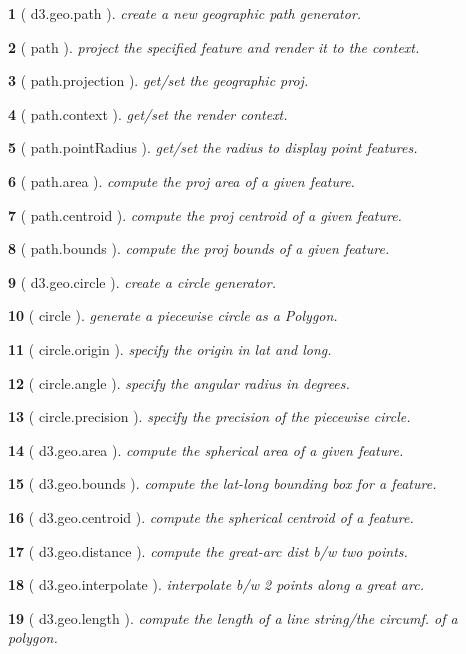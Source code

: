 \documentclass[10pt,landscape,letterpaper]{article}
\newcounter{thm}
\newcommand{\hdrule}{\vspace{-4pt} \hdashrule[0.25ex]{\fill}{.5pt}{1pt}\vspace{-4pt}}
\theoremstyle{mytheoremstyle}
\newtheorem*{thm}{}
\begin{document}
\begin{multicols}{3}
\begin{thm} [ d3.geo.path ]  create a new geographic path generator.
\end{thm}\begin{thm} [ path ]  project the specified feature and render it to the context.
\end{thm}\begin{thm} [ path.projection ]  get/set the geographic proj.
\end{thm}\begin{thm} [ path.context ]  get/set the render context.
\end{thm}\begin{thm} [ path.pointRadius ]  get/set the radius to display point features.
\end{thm}\begin{thm} [ path.area ]  compute the proj area of a given feature.
\end{thm}\begin{thm} [ path.centroid ]  compute the proj centroid of a given feature.
\end{thm}\begin{thm} [ path.bounds ]  compute the proj bounds of a given feature.
\end{thm}\begin{thm} [ d3.geo.circle ]  create a circle generator.
\end{thm}\begin{thm} [ circle ]  generate a piecewise circle as a Polygon.
\end{thm}\begin{thm} [ circle.origin ]  specify the origin in lat and long.
\end{thm}\begin{thm} [ circle.angle ]  specify the angular radius in degrees.
\end{thm}\begin{thm} [ circle.precision ]  specify the precision of the piecewise circle.
\end{thm}\begin{thm} [ d3.geo.area ]  compute the spherical area of a given feature.
\end{thm}\begin{thm} [ d3.geo.bounds ]  compute the lat-long bounding box for a feature.
\end{thm}\begin{thm} [ d3.geo.centroid ]  compute the spherical centroid of a feature.
\end{thm}\begin{thm} [ d3.geo.distance ]  compute the great-arc dist b/w two points.
\end{thm}\begin{thm} [ d3.geo.interpolate ]  interpolate b/w 2 points along a great arc.
\end{thm}\begin{thm} [ d3.geo.length ]  compute the length of a line string/the circumf. of a polygon.
\end{thm}
\hdrule

\end{multicols}
\end{document}
